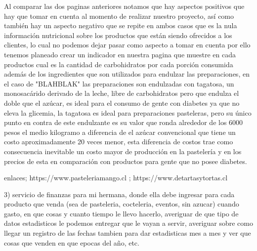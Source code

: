 \documentclass[preprintnumbers,superscriptaddress,amsmath,%
  amssymb,aps,reprint,nofootinbib]{revtex4-1}
\numberwithin{equation}{section}
\begin{document}
Al comparar las dos paginas anteriores notamos que hay aspectos positivos que hay que tomar en cuenta al momento de realizar nuestro proyecto, así como también hay un aspecto negativo que se repite en ambos casos que es la nula información nutricional sobre los productos que están siendo ofrecidos a los clientes, lo cual no podemos dejar pasar como aspecto a tomar en cuenta por ello tenemos planeado crear un indicador en nuestra pagina que muestre en cada productos cual es la cantidad de carbohidratos por cada porción consumida además de los ingredientes que son utilizados para endulzar las preparaciones, en el caso de "BLAHBLAK" las preparaciones son endulzadas con tagatosa, un monosacárido derivado de la leche, libre de carbohidratos pero que endulza el doble que el azúcar, es ideal para el consumo de gente con diabetes ya que no eleva la glicemia, la tagatosa es ideal para preparaciones pasteleras, pero su único punto en contra de este endulzante es su valor que ronda alrededor de los 6000 pesos el medio kilogramo a diferencia de el azúcar convencional que tiene un costo aproximadamente 20 veces menor, esta diferencia de costos trae como consecuencia inevitable un costo mayor de producción en la pastelería y en los precios de esta en comparación con productos para gente que no posee diabetes.

enlaces; https://www.pasteleriamango.cl  ; https://www.detartasytortas.cl



3) servicio de finanzas para mi hermana, donde ella debe ingresar para cada producto que venda (sea de pasteleria, cocteleria, eventos, sin azucar) cuando gasto, en que cosas y cuanto tiempo le llevo hacerlo, averiguar de que tipo de datos estadisticos le podemos entregar que le vayan  a servir, averiguar sobre como llegar un registro de las fechas tambien para dar estadisticas mes a mes y ver que cosas que venden en que epocas del año, etc. 
\end{document}
